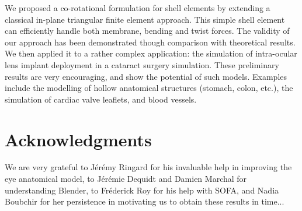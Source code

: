\documentclass{llncs}
\begin{document}
We proposed a co-rotational formulation for shell elements by extending a classical in-plane triangular finite element approach. This simple shell element can efficiently handle both membrane, bending and twist forces. The validity of our approach has been demonstrated though comparison with theoretical results. We then applied it to a rather complex application: the simulation of intra-ocular lens implant deployment in a cataract surgery simulation. These preliminary results are very encouraging, and show the potential of such models. Examples include the modelling of hollow anatomical structures (stomach, colon, etc.), the simulation of cardiac valve leaflets, and blood vessels. 

\section*{Acknowledgments}
We are very grateful to J\'er\'emy Ringard for his invaluable help in improving the eye anatomical model, to J\'er\'emie Dequidt and Damien Marchal for understanding Blender, to Fr\'ederick Roy for his help with SOFA, and Nadia Boubchir for her persistence in motivating us to obtain these results in time...



\end{document}
